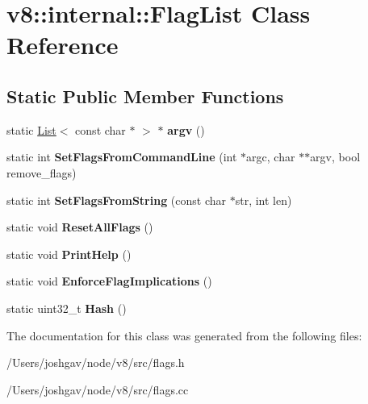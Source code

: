 \hypertarget{classv8_1_1internal_1_1_flag_list}{}\section{v8\+:\+:internal\+:\+:Flag\+List Class Reference}
\label{classv8_1_1internal_1_1_flag_list}
\subsection*{Static Public Member Functions}
\begin{DoxyCompactItemize}
\item 
static \hyperlink{classv8_1_1internal_1_1_list}{List}$<$ const char $\ast$ $>$ $\ast$ {\bfseries argv} ()\hypertarget{classv8_1_1internal_1_1_flag_list_ae19fa3a6a3a56f97aba138bdbf7182bc}{}\label{classv8_1_1internal_1_1_flag_list_ae19fa3a6a3a56f97aba138bdbf7182bc}

\item 
static int {\bfseries Set\+Flags\+From\+Command\+Line} (int $\ast$argc, char $\ast$$\ast$argv, bool remove\+\_\+flags)\hypertarget{classv8_1_1internal_1_1_flag_list_a5e868bcb738a32c45e3043d79f49a516}{}\label{classv8_1_1internal_1_1_flag_list_a5e868bcb738a32c45e3043d79f49a516}

\item 
static int {\bfseries Set\+Flags\+From\+String} (const char $\ast$str, int len)\hypertarget{classv8_1_1internal_1_1_flag_list_acbbee102fcae7f33640b46f43cadfee4}{}\label{classv8_1_1internal_1_1_flag_list_acbbee102fcae7f33640b46f43cadfee4}

\item 
static void {\bfseries Reset\+All\+Flags} ()\hypertarget{classv8_1_1internal_1_1_flag_list_a8cca6feecacd8b821a2bb1510841c421}{}\label{classv8_1_1internal_1_1_flag_list_a8cca6feecacd8b821a2bb1510841c421}

\item 
static void {\bfseries Print\+Help} ()\hypertarget{classv8_1_1internal_1_1_flag_list_ac57adff656528e145eaaa70f13a2d10c}{}\label{classv8_1_1internal_1_1_flag_list_ac57adff656528e145eaaa70f13a2d10c}

\item 
static void {\bfseries Enforce\+Flag\+Implications} ()\hypertarget{classv8_1_1internal_1_1_flag_list_a7e0ea5afcd3a038ec945c706f8e6a953}{}\label{classv8_1_1internal_1_1_flag_list_a7e0ea5afcd3a038ec945c706f8e6a953}

\item 
static uint32\+\_\+t {\bfseries Hash} ()\hypertarget{classv8_1_1internal_1_1_flag_list_a467d6832cccdc6acb76959fb7158c9df}{}\label{classv8_1_1internal_1_1_flag_list_a467d6832cccdc6acb76959fb7158c9df}

\end{DoxyCompactItemize}


The documentation for this class was generated from the following files\+:\begin{DoxyCompactItemize}
\item 
/\+Users/joshgav/node/v8/src/flags.\+h\item 
/\+Users/joshgav/node/v8/src/flags.\+cc\end{DoxyCompactItemize}
